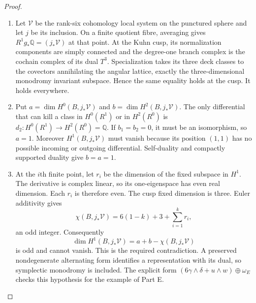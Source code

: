 \documentclass[11pt,a4paper]{article}
\theoremstyle{definition}
\begin{document}
\begin{proof}
\begin{enumerate}[label=\arabic*.]
\item Let $\mathcal V$ be the rank-six cohomology local system on
the punctured sphere and let $j$ be its inclusion.  On a finite
quotient fibre, averaging gives $R^1g_*\mathbb Q=(j_*\mathcal V)$
at that point.  At the Kuhn cusp, its normalization components
are simply connected and the degree-one branch complex is
the cochain complex of its dual $T^3$.  Specialization takes
its three deck classes to the covectors annihilating the
angular lattice, exactly the three-dimensional monodromy
invariant subspace.  Hence the same equality holds at the cusp.
It holds everywhere.

\item Put $a=\dim H^0(B,j_*\mathcal V)$ and
$b=\dim H^2(B,j_*\mathcal V)$.  The only differential that
can kill a class in $H^0(R^1)$ or in $H^2(R^0)$ is
$d_2:H^0(R^1)\to H^2(R^0)=\mathbb Q$.  If $b_1=b_2=0$,
it must be an isomorphism, so $a=1$.  Moreover
$H^1(B,j_*\mathcal V)$ must vanish because its position
$(1,1)$ has no possible incoming or outgoing differential.
Self-duality and compactly supported duality give $b=a=1$.

\item At the $i$th finite point, let $r_i$ be the dimension of the
fixed subspace in $H^1$.  The derivative is complex linear,
so its one-eigenspace has even real dimension.  Each $r_i$
is therefore even.  The cusp fixed dimension is three.
Euler additivity gives
\[
 \chi(B,j_*\mathcal V)=6(1-k)+3+\sum_{i=1}^k r_i,
\]
an odd integer.  Consequently
\[
 \dim H^1(B,j_*\mathcal V)=a+b-\chi(B,j_*\mathcal V)
\]
is odd and cannot vanish.  This is the required contradiction.
A preserved nondegenerate alternating form identifies a
representation with its dual, so symplectic monodromy is
included.  The explicit form
$(6\gamma\wedge\delta+u\wedge w)\oplus\omega_E$
checks this hypothesis for the example of Part E.

\end{enumerate}
\end{proof}
\end{document}
